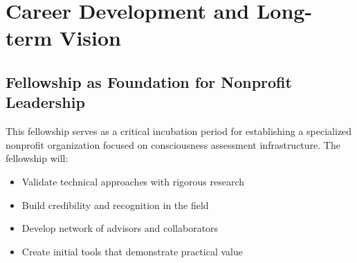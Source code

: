 \documentclass[11pt,a4paper]{article}
\begin{document}
\section{Career Development and Long-term Vision}
\label{sec:career}





\subsection{Fellowship as Foundation for Nonprofit Leadership}

This fellowship serves as a critical incubation period for establishing a specialized nonprofit organization focused on consciousness assessment infrastructure. The fellowship will:

\begin{itemize}
    \item Validate technical approaches with rigorous research
    \item Build credibility and recognition in the field
    \item Develop network of advisors and collaborators
    \item Create initial tools that demonstrate practical value
\end{itemize}
\end{document}

